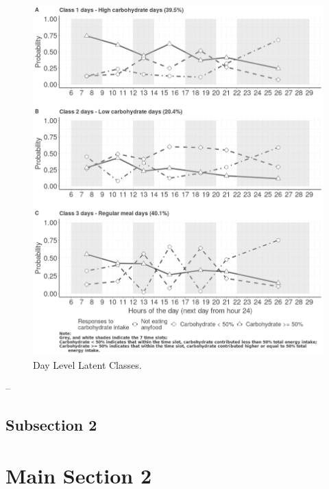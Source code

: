 \begin{figure}
	\centering
	\includegraphics{Figures/level1.png}
	\decoRule
	\caption[Day Level Latent Classes.]{Day Level Latent Classes.}
	\label{fig:level1}
\end{figure}
\vspace{-0.6cm}



--

\subsection{Subsection 2}


\section{Main Section 2}





